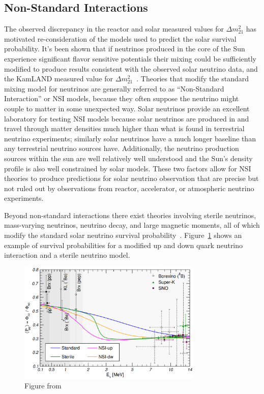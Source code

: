 \subsection{Non-Standard Interactions}
The observed discrepancy in the reactor and solar measured values for $\Delta m^{2}_{21}$
has motivated re-consideration of the models used to predict the solar survival
probability.
It's been shown that if neutrinos produced in the core of the Sun experience
significant flavor sensitive potentials their mixing could be sufficiently modified
to produce results consistent with the observed solar neutrino data, and
the KamLAND measured value for $\Delta m^{2}_{21}$~\citep{richie_nsi,mavans_nsi, nsi_friedland}.
Theories that modify the standard mixing model for neutrinos are generally
referred to as ``Non-Standard Interaction'' or NSI models, because
they often suppose the neutrino might couple to matter in some unexpected way.
Solar neutrinos provide an excellent laboratory for testing NSI models
because solar neutrinos are produced in and travel through matter densities much
higher than what is found in terrestrial neutrino experiments;
similarly solar neutrinos have a much longer baseline than any terrestrial
neutrino sources have.
Additionally, the neutrino production sources within the sun are well
relatively well understood and the Sun's density profile is also well
constrained by solar models.
These two factors allow for NSI theories to produce predictions for solar
neutrino observation that are precise but not ruled out by observations from
reactor, accelerator, or atmospheric neutrino experiments.

Beyond non-standard interactions there exist theories involving sterile neutrinos,
mass-varying neutrinos, neutrino decay, and large magnetic moments, all of
which modify the standard solar neutrino survival probability~\citep{maltoni_solar, richie_nsi}.
Figure~\ref{fig:maltoni_mixing} shows an example of survival probabilities
for a modified up and down quark neutrino interaction and a sterile neutrino
model.

\begin{figure}[htbp]
\centering
\includegraphics[width=0.78\textwidth]{maltoni_mixing}
\caption[]{Figure from~\citep{maltoni_solar}}
\label{fig:maltoni_mixing}
\end{figure}


